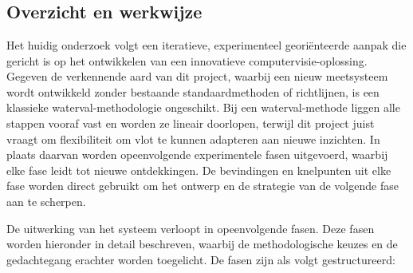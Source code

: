 
\chapter{}%
\label{ch:methodologie}

\section{Overzicht en werkwijze}
\label{sec:methodologie-overzicht}

Het huidig onderzoek volgt een iteratieve, experimenteel geori{\"e}nteerde aanpak die gericht is op het ontwikkelen van een innovatieve computervisie-oplossing. Gegeven de verkennende aard van dit project, waarbij een nieuw meetsysteem wordt ontwikkeld zonder bestaande standaardmethoden of richtlijnen, is een klassieke waterval-methodologie ongeschikt. Bij een waterval-methode liggen alle stappen vooraf vast en worden ze lineair doorlopen, terwijl dit project juist vraagt om flexibiliteit om vlot te kunnen adapteren aan nieuwe inzichten. In plaats daarvan worden opeenvolgende experimentele fasen uitgevoerd, waarbij elke fase leidt tot nieuwe ontdekkingen. De bevindingen en knelpunten uit elke fase worden direct gebruikt om het ontwerp en de strategie van de volgende fase aan te scherpen.

De uitwerking van het systeem verloopt in opeenvolgende fasen. Deze fasen worden hieronder in detail beschreven, waarbij de methodologische keuzes en de gedachtegang erachter worden toegelicht. De fasen zijn als volgt gestructureerd:

